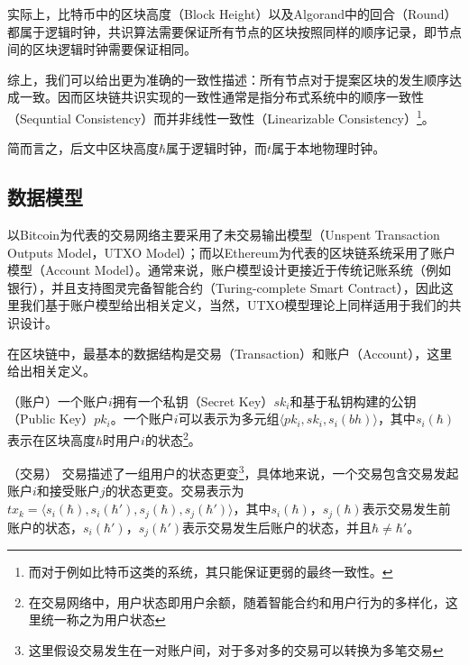 实际上，比特币中的区块高度（Block Height）以及Algorand中的回合（Round）都属于逻辑时钟，共识算法需要保证所有节点的区块按照同样的顺序记录，即节点间的区块逻辑时钟需要保证相同。

综上，我们可以给出更为准确的一致性描述：所有节点对于提案区块的发生顺序达成一致。因而区块链共识实现的一致性通常是指分布式系统中的顺序一致性（Sequntial Consistency）而并非线性一致性（Linearizable Consistency）\footnote{而对于例如比特币这类的系统，其只能保证更弱的最终一致性。}。


简而言之，后文中区块高度$\hbar$属于逻辑时钟，而$t$属于本地物理时钟。


\subsection{数据模型}
以Bitcoin为代表的交易网络主要采用了未交易输出模型（Unspent Transaction Outputs Model，UTXO Model）；而以Ethereum为代表的区块链系统采用了账户模型（Account Model）。通常来说，账户模型设计更接近于传统记账系统（例如银行），并且支持图灵完备智能合约（Turing-complete Smart Contract），因此这里我们基于账户模型给出相关定义，当然，UTXO模型理论上同样适用于我们的共识设计。

在区块链中，最基本的数据结构是交易（Transaction）和账户（Account），这里给出相关定义。

\begin{definition}
（账户）一个账户$i$拥有一个私钥（Secret Key）$sk_i$和基于私钥构建的公钥（Public Key）$pk_i$。一个账户$i$可以表示为多元组$\langle pk_i,sk_i,s_i(bh)\rangle$，其中$s_i(\hbar)$表示在区块高度$\hbar$时用户$i$的状态\footnote{在交易网络中，用户状态即用户余额，随着智能合约和用户行为的多样化，这里统一称之为用户状态}。
\end{definition}


\begin{definition}
（交易） 交易描述了一组用户的状态更变\footnote{这里假设交易发生在一对账户间，对于多对多的交易可以转换为多笔交易}，具体地来说，一个交易包含交易发起账户$i$和接受账户$j$的状态更变。交易表示为$tx_k=\langle s_i(\hbar),s_i(\hbar'),s_j(\hbar),s_j(\hbar')\rangle$，其中$s_i(\hbar)$，$s_j(\hbar)$表示交易发生前账户的状态，$s_i(\hbar')$，$s_j(\hbar')$表示交易发生后账户的状态，并且$\hbar \neq \hbar'$。
\end{definition}

